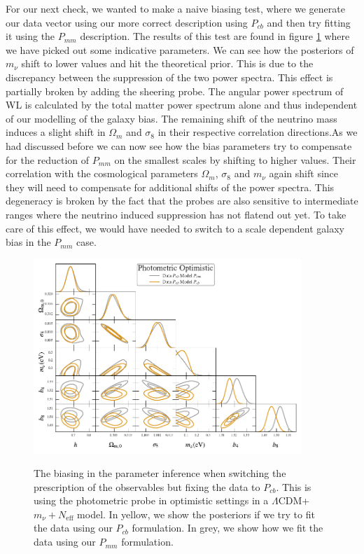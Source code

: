 \documentclass[oneside]{book}
\begin{document}
For our next check, we wanted to make a naive biasing test, where we generate our data vector using our more correct description using $P_{cb}$ and then try fitting it using the $P_{mm}$ description. The results of this test are found in figure \ref{fig:trianglePcbVPmm_biased} where we have picked out some indicative parameters. We can see how the posteriors of $m_\nu$ shift to lower values and hit the theoretical prior. This is due to the discrepancy between the suppression of the two power spectra. This effect is partially broken by adding the sheering probe. The angular power spectrum of WL is calculated by the total matter power spectrum alone and thus independent of our modelling of the galaxy bias. The remaining shift of the neutrino mass induces  a slight shift in $\Omega_m$ and $\sigma_8$ in their respective correlation directions.As we had discussed before we can now see how the bias parameters try to compensate for the reduction of $P_{mm}$ on the smallest scales by shifting to higher values. Their correlation with the cosmological parameters $\Omega_m$, $\sigma_8$ and $m_\nu$ again shift since they will need to compensate for additional shifts of the power spectra. This degeneracy is broken by the fact that the probes are also sensitive to intermediate ranges where the neutrino induced suppression has not flatend out yet. To take care of this effect, we would have needed to switch to a scale dependent galaxy bias in the $P_{mm}$ case.\newline
\begin{figure}
    \centering
    \caption{The biasing in the parameter inference when switching the prescription of the observables but fixing the data to $P_{cb}$. This is using the photometric probe in optimistic settings in a $\Lambda$CDM+$m_\nu+N_\mathrm{eff}$ model. In yellow, we show the posteriors if we try to fit the data using our $P_{cb}$ formulation. In grey, we show how we fit the data using our $P_{mm}$ formulation.}
    \includegraphics[width=0.9\textwidth]{P_MN_Pcb_v_Pmm_bias.pdf}
    \label{fig:trianglePcbVPmm_biased}
\end{figure}
\end{document}
